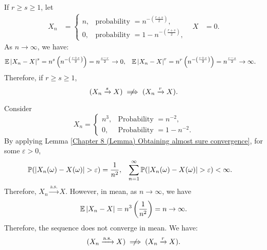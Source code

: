 \documentclass{huhtakm-template-book-v2}
\newcommand{\prob}{\mathbb{P}}
\newcommand{\expect}{\mathbb{E}}
\begin{document}
    \begin{eg}
        If $r \geq s \geq 1$, let
        \begin{align*}
            X_{n} &= \begin{cases}
                n, &\text{probability } = n^{-\left(\frac{r+s}{2}\right)},\\
                0, &\text{probability } = 1-n^{-\left(\frac{r+s}{2}\right)},
            \end{cases} & X &= 0.
        \end{align*}
        As $n \to \infty$, we have:
        \begin{align*}
            \expect\abs{X_{n}-X}^{s} &= n^{s}\left(n^{-\left(\frac{r+s}{2}\right)}\right) = n^{\frac{s-r}{2}} \to 0, & \expect\abs{X_{n}-X}^{r} &= n^{r}\left(n^{-\left(\frac{r+s}{2}\right)}\right) = n^{\frac{r-s}{2}} \to \infty.
        \end{align*}
        Therefore, if $r \geq s \geq 1$,
        \begin{equation*}
            (X_{n} \xrightarrow{s} X) \centernot\implies (X_{n} \xrightarrow{r} X).
        \end{equation*}
    \end{eg}
    \begin{eg}
        Consider
        \begin{equation*}
            X_{n} = \begin{cases}
                n^{3}, &\text{Probability } = n^{-2},\\
                0, &\text{Probability } = 1-n^{-2}.
            \end{cases}
        \end{equation*}
        By applying Lemma \ref{Chapter 8 (Lemma) Obtaining almost sure convergence}, for some $\varepsilon > 0$,
        \begin{align*}
            \prob(\abs{X_{n}(\omega)-X(\omega)} > \varepsilon) &= \frac{1}{n^{2}}, & \sum_{n = 1}^{\infty}\prob(\abs{X_{n}(\omega)-X(\omega)} > \varepsilon) &< \infty.
        \end{align*}
        Therefore, $X_{n} \xrightarrow{\text{a.s.}} X$. However, in mean, as $n \to \infty$, we have
        \begin{equation*}
            \expect\abs{X_{n}-X} = n^{3}\left(\frac{1}{n^{2}}\right) = n \to \infty.
        \end{equation*}
        Therefore, the sequence does not converge in mean. We have:
        \begin{equation*}
            (X_{n} \xrightarrow{\text{a.s.}} X) \centernot\implies (X_{n} \xrightarrow{r} X).
        \end{equation*}
    \end{eg}
\end{document}
